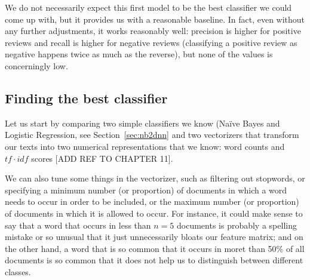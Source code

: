 
We do not necessarily expect this first model to be the best
classifier we could come up with, but it provides us with a reasonable
baseline. In fact, even without any further adjustments, it works
reasonably well: precision is higher for positive reviews and recall
is higher for negative reviews (classifying a positive review as
negative happens twice as much as the reverse), but none of the values
is concerningly low.




\subsection{Finding the best classifier}


Let us start by comparing two simple classifiers we know (Na\"ive
Bayes and Logistic Regression, see Section~\ref{sec:nb2dnn} and two
vectorizers that transform our texts into two numerical
representations that we know: word counts and $tf\cdot idf$ scores
[ADD REF TO CHAPTER 11].

We can also tune some things in the vectorizer, such as filtering out
stopwords, or specifying a minimum number (or proportion) of documents
in which a word needs to occur in order to be included, or the maximum
number (or proportion) of documents in which it is allowed to
occur. For instance, it could make sense to say that a word that
occurs in less than $n=5$ documents is probably a spelling mistake or
so unusual that it just unnecessarily bloats our feature matrix; and
on the other hand, a word that is so common that it occurs in moret
than 50\% of all documents is so common that it does not help us to
distinguish between different classes.

